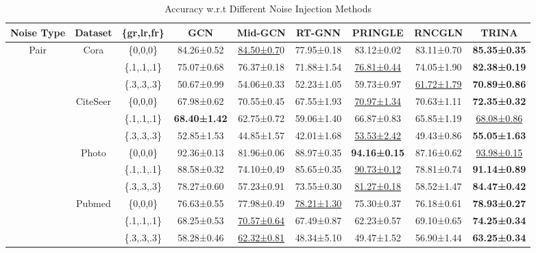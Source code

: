 \documentclass[sigconf, anonymous, review]{acmart}
\begin{document}
\begin{table}
  \centering
  \caption{Accuracy w.r.t Different Noise Injection Methods}
  {\small
  \begin{tabular}{ccccccccc}
    \toprule
    Noise Type &Dataset&\{gr,lr,fr\} & GCN &Mid-GCN&RT-GNN&PRINGLE&RNCGLN&TRINA\\
    \midrule
    \multirow{12}{*}{Pair} & \multirow{3}{*}{Cora} &\{0,0,0\}&84.26±0.52&\underline{84.50±0.7}0&77.95±0.18&83.12±0.02&83.11±0.70&\textbf{85.35±0.35}\\
    &  &\{.1,.1,.1\}&75.07±0.68 &76.37±0.18&71.88±1.54&\underline{76.81±0.44}&74.05±1.90 & \textbf{82.38±0.19} \\
    &  &\{.3,.3,.3\}&50.67±0.99&54.06±0.33&52.23±1.05&59.73±0.97&\underline{61.72±1.79}&\textbf{70.89±0.86}\\
    & \multirow{3}{*}{CiteSeer} &\{0,0,0\}&67.98±0.62 &70.55±0.45&67.55±1.93&\underline{70.97±1.34}&70.63±1.11 &\textbf{72.35±0.32}  \\
    &  &\{.1,.1,.1\}&\textbf{68.40±1.42}&62.75±0.72&59.06±1.40&66.87±0.83&65.85±1.19&\underline{68.08±0.86}\\
    &  &\{.3,.3,.3\}&52.85±1.53&44.85±1.57&42.01±1.68&\underline{53.53±2.42}&49.43±0.86&\textbf{55.05±1.63}\\
    & \multirow{3}{*}{Photo} &\{0,0,0\}&92.36±0.13&81.96±0.06&88.97±0.35&\textbf{94.16±0.15}&87.16±0.62&\underline{93.98±0.15}\\
    &  &\{.1,.1,.1\}&88.58±0.32 &74.10±0.49&85.65±0.35&\underline{90.73±0.12}&78.81±0.74 & \textbf{91.14±0.89} \\
    &  &\{.3,.3,.3\}&78.27±0.60&57.23±0.91&73.55±0.30&\underline{81.27±0.18}&58.52±1.47&\textbf{84.47±0.42}\\
    & \multirow{3}{*}{Pubmed} &\{0,0,0\}&76.63±0.55 &77.98±0.49&\underline{78.21±1.30}&75.30±0.37&76.18±0.61 &\textbf{78.93±0.27}  \\
    &  &\{.1,.1,.1\}& 68.25±0.53&\underline{70.57±0.64}&67.49±0.87&62.23±0.57&69.10±0.65 & \textbf{74.25±0.34} \\
    &  &\{.3,.3,.3\}&58.28±0.46&\underline{62.32±0.81}&48.34±5.10&49.47±1.52&56.90±1.44&\textbf{63.25±0.34}\\
    \midrule
    

\end{tabular}}
\end{table}
\end{document}
